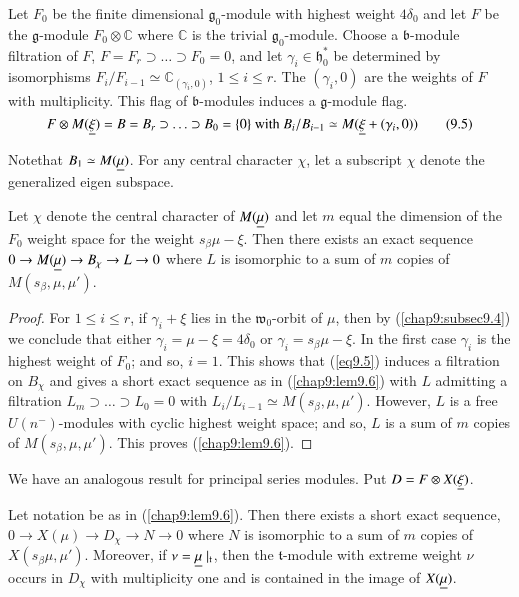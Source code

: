 Let $F_0$ be the finite dimensional $\mathfrak{g}_0$-module with
highest weight $4\delta_0$ and let $F$ be the $\mathfrak{g}$-module
$F_0 \otimes \mathbb{C}$ where $\mathbb{C}$ is the trivial
$\mathfrak{g}_0$-module. Choose a $\mathfrak{b}$-module filtration of
$F$, $F = F_r \supset \ldots \supset F_0 = 0$, and let $\gamma_i \in
\mathfrak{h}^*_0$ be determined by isomorphisms $F_i/ F_{i-1} \simeq
\mathbb{C}_{(\gamma_i, 0)}$, $1 \leq i \leq r$. The $(\gamma_i , 0)$
are the weights of $F$ with multiplicity. This flag of
$\mathfrak{b}$-modules induces a $\mathfrak{g}$-module flag. 
\begin{equation*}
F\otimes M(\underline{\xi}) = B = B_r \supset \ldots \supset B_0 = \{0\}
\text{ with } B_i/ B_{i-1} \simeq M (\underline{\xi} + (\gamma_i , 0))
\tag{9.5}\label{eq9.5}
\end{equation*}
 
Note\pageoriginale that $B_1 \simeq M(\underline{\mu})$. For any central
character $\chi$, let a subscript $\chi$ denote the generalized eigen
subspace. 

\setcounter{prop}{5}
\begin{lemma}\label{chap9:lem9.6}
Let $\chi$ denote the central character of $M(\underline{\mu})$ and let
$m$ equal the dimension of the $F_0$ weight space for the weight
$s_\beta \mu - \xi$. Then there exists an exact sequence $0 \to M
(\underline{\mu}) \to B_\chi \to L \to 0 $ where $L$ is isomorphic to a sum of
$m$ copies of $M(s_\beta, \mu, \mu')$. 
\end{lemma}

\begin{proof}
For $1 \leq i \leq r$, if $\gamma_i + \xi$ lies in the
$\mathfrak{w}_0$-orbit of $\mu$, then by (\ref{chap9:subsec9.4}) we
conclude that either 
$\gamma_i = \mu - \xi = 4 \delta_0$ or $\gamma_i = s_\beta \mu -
\xi$. In the first case $\gamma_i$ is the highest weight of $F_0$; and
so, $i =1$. This shows that (\ref{eq9.5}) induces a filtration on $B_\chi$ and
gives a short exact sequence as in (\ref{chap9:lem9.6}) with $L$ admitting a
filtration $L_m \supset \ldots \supset L_0 = 0$ with $L_i / L_{i-1}
\simeq M(s_\beta, \mu, \mu')$. However, $L$  is a free
$U(n^-)$-modules with cyclic highest weight space; and so, $L$ is a
sum of $m$ copies of $M(s_\beta, \mu, \mu')$. This proves (\ref{chap9:lem9.6}).
\end{proof}

We have an analogous result for principal series modules. Put $D =
F\otimes X(\underline{\xi})$. 

\begin{lemma}\label{chap9:lem9.7}
Let notation be as in (\ref{chap9:lem9.6}). Then there exists a short
exact sequence, 
$0 \to X(\mu) \to D_\chi \to N \to 0$ where $N$ is isomorphic to a sum
of $m$ copies of $X(s_\beta \mu, \mu')$. Moreover, if $\nu = \underline{\mu}
\mid_\mathfrak{t}$, then the $\mathfrak{t}$-module with extreme weight
$\nu$ occurs in $D_\chi$ with multiplicity one and is contained in the
image of $X(\underline{\mu})$. 
\end{lemma}

